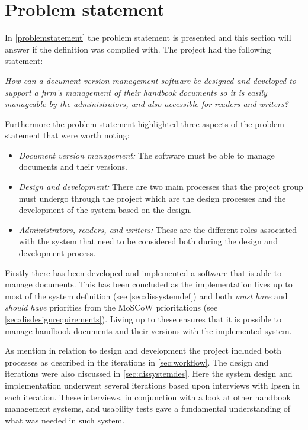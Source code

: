 \section{Problem statement}
In \cref{problemstatement} the problem statement is presented and this section will answer if the definition was complied with.
The project had the following statement:

\begin{center}
\textit{How can a document version management software be designed and developed to support a firm's management of their handbook documents so it is easily manageable by the administrators, and also accessible for readers and writers?}
\end{center}

Furthermore the problem statement highlighted three aspects of the problem statement that were worth noting:

\begin{itemize}
	\item
		\textit{Document version management:}
		The software must be able to manage documents and their versions.
	\item
		\textit{Design and development:}
		There are two main processes that the project group must undergo through the project which are the design processes and the development of the system based on the design.
	\item
		\textit{Administrators, readers, and writers:}
		These are the different roles associated with the system that need to be considered both during the design and development process.

\end{itemize}

Firstly there has been developed and implemented a software that is able to manage documents.
This has been concluded as the implementation lives up to most of the system definition (see \cref{sec:dissystemdef}) and both \textit{must have} and \textit{should have} priorities from the MoSCoW prioritations (see \cref{sec:disdesignrequirements}).
Living up to these ensures that it is possible to manage handbook documents and their versions with the implemented system.

As mention in relation to design and development the project included both processes as described in the iterations in \cref{sec:workflow}.
The design and iterations were also discussed in \cref{sec:dissystemdes}.
Here the system design and implementation underwent several iterations based upon interviews with Ipsen in each iteration.
These interviews, in conjunction with a look at other handbook management systems, and usability tests gave a fundamental understanding of what was needed in such system.

